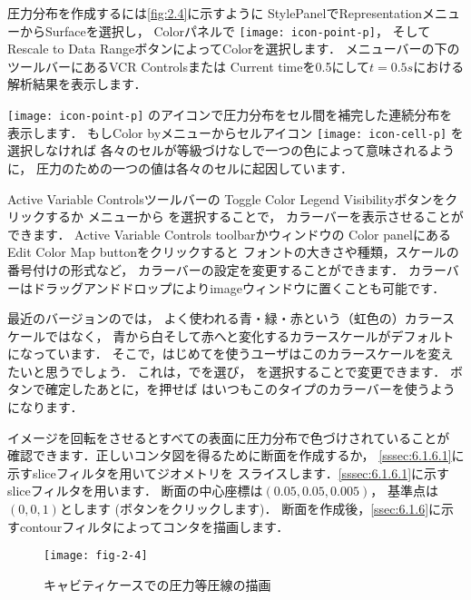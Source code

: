 圧力分布を作成するには\autoref{fig:2.4}に示すように
StylePanelでRepresentationメニューからSurfaceを選択し，
Colorパネルで \texttt{[image: icon-point-p]}，
そしてRescale to Data RangeボタンによってColorを選択します．
メニューバーの下のツールバーにあるVCR Controlsまたは
Current timeを0.5にして$t = 0.5\unit{s}$における解析結果を表示します．

\texttt{[image: icon-point-p]} のアイコンで圧力分布をセル間を補完した連続分布を表示します．
もしColor byメニューからセルアイコン \texttt{[image: icon-cell-p]} を選択しなければ
各々のセルが等級づけなしで一つの色によって意味されるように，
圧力のための一つの値は各々のセルに起因しています．

Active Variable Controlsツールバーの
Toggle Color Legend Visibilityボタンをクリックするか
メニューから
%
%
を選択することで，
カラーバーを表示させることができます．
Active Variable Controls toolbarかウィンドウの
Color panelにあるEdit Color Map buttonをクリックすると
フォントの大きさや種類，スケールの番号付けの形式など，
カラーバーの設定を変更することができます．
カラーバーはドラッグアンドドロップによりimageウィンドウに置くことも可能です．

最近のバージョンのでは，
よく使われる青・緑・赤という（虹色の）カラースケールではなく，
青から白そして赤へと変化するカラースケールがデフォルトになっています．
そこで，はじめてを使うユーザはこのカラースケールを変えたいと思うでしょう．
これは，でを選び，
を選択することで変更できます．
ボタンで確定したあとに，を押せば
はいつもこのタイプのカラーバーを使うようになります．

イメージを回転をさせるとすべての表面に圧力分布で色づけされていることが
確認できます．正しいコンタ図を得るために断面を作成するか，
\autoref{sssec:6.1.6.1}に示すsliceフィルタを用いてジオメトリを
スライスします．\autoref{sssec:6.1.6.1}に示すsliceフィルタを用います．
断面の中心座標は$(0.05, 0.05, 0.005)$，
基準点は$(0, 0, 1)$とします (ボタンをクリックします)．
断面を作成後，\autoref{ssec:6.1.6}に示すcontourフィルタによってコンタを描画します．


\begin{figure}[ht]
 \texttt{[image: fig-2-4]}
 \caption{キャビティケースでの圧力等圧線の描画}
 \label{fig:2.4}
\end{figure}


